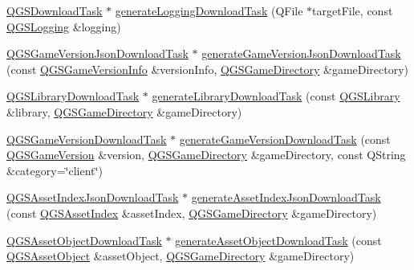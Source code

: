 \begin{DoxyCompactItemize}
\item 
\mbox{\hyperlink{class_q_g_s_download_task}{Q\+G\+S\+Download\+Task}} $\ast$ \mbox{\hyperlink{class_q_g_s_download_task_factory_aee190f4d87fcf489bd426db1f33c92e6}{generate\+Logging\+Download\+Task}} (Q\+File $\ast$target\+File, const \mbox{\hyperlink{class_q_g_s_logging}{Q\+G\+S\+Logging}} \&logging)
\item 
\mbox{\hyperlink{class_q_g_s_game_version_json_download_task}{Q\+G\+S\+Game\+Version\+Json\+Download\+Task}} $\ast$ \mbox{\hyperlink{class_q_g_s_download_task_factory_abac9e65e97be286c534e90596022428d}{generate\+Game\+Version\+Json\+Download\+Task}} (const \mbox{\hyperlink{class_q_g_s_game_version_info}{Q\+G\+S\+Game\+Version\+Info}} \&version\+Info, \mbox{\hyperlink{class_q_g_s_game_directory}{Q\+G\+S\+Game\+Directory}} \&game\+Directory)
\item 
\mbox{\hyperlink{class_q_g_s_library_download_task}{Q\+G\+S\+Library\+Download\+Task}} $\ast$ \mbox{\hyperlink{class_q_g_s_download_task_factory_a872f18398d986321b6b6a306b64c0eae}{generate\+Library\+Download\+Task}} (const \mbox{\hyperlink{class_q_g_s_library}{Q\+G\+S\+Library}} \&library, \mbox{\hyperlink{class_q_g_s_game_directory}{Q\+G\+S\+Game\+Directory}} \&game\+Directory)
\item 
\mbox{\hyperlink{class_q_g_s_game_version_download_task}{Q\+G\+S\+Game\+Version\+Download\+Task}} $\ast$ \mbox{\hyperlink{class_q_g_s_download_task_factory_a6e6cf8557ac479052b62d11b678d03d7}{generate\+Game\+Version\+Download\+Task}} (const \mbox{\hyperlink{class_q_g_s_game_version}{Q\+G\+S\+Game\+Version}} \&version, \mbox{\hyperlink{class_q_g_s_game_directory}{Q\+G\+S\+Game\+Directory}} \&game\+Directory, const Q\+String \&category=\char`\"{}client\char`\"{})
\item 
\mbox{\hyperlink{class_q_g_s_asset_index_json_download_task}{Q\+G\+S\+Asset\+Index\+Json\+Download\+Task}} $\ast$ \mbox{\hyperlink{class_q_g_s_download_task_factory_aad39e8cdb4097f1cea118ad4a540fbd3}{generate\+Asset\+Index\+Json\+Download\+Task}} (const \mbox{\hyperlink{class_q_g_s_asset_index}{Q\+G\+S\+Asset\+Index}} \&asset\+Index, \mbox{\hyperlink{class_q_g_s_game_directory}{Q\+G\+S\+Game\+Directory}} \&game\+Directory)
\item 
\mbox{\hyperlink{class_q_g_s_asset_object_download_task}{Q\+G\+S\+Asset\+Object\+Download\+Task}} $\ast$ \mbox{\hyperlink{class_q_g_s_download_task_factory_a47c36c1db347024021fbcb612212dcbe}{generate\+Asset\+Object\+Download\+Task}} (const \mbox{\hyperlink{class_q_g_s_asset_object}{Q\+G\+S\+Asset\+Object}} \&asset\+Object, \mbox{\hyperlink{class_q_g_s_game_directory}{Q\+G\+S\+Game\+Directory}} \&game\+Directory)

\end{DoxyCompactItemize}
